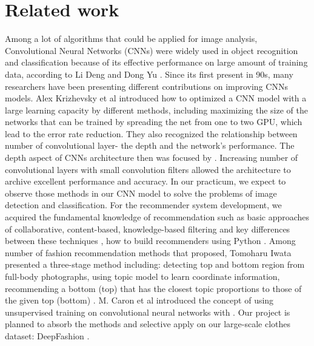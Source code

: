 \section{Related work}
Among a lot of algorithms that could be applied for image analysis, Convolutional Neural Networks (CNNs) were widely used in object recognition and classification because of its effective performance on large amount of training data, according to Li Deng and Dong Yu \cite{deng2014deep}. Since its first present in 90s, many researchers have been presenting different contributions on improving CNNs models. Alex Krizhevsky et al \cite{krizhevsky2017imagenet} introduced how to optimized a CNN model with a large learning capacity by different methods, including maximizing the size of the networks that can be trained by spreading the net from one to two GPU, which lead to the error rate reduction. They also recognized the relationship between number of convolutional layer- the depth and the network’s performance. The depth aspect of CNNs architecture then was focused by \cite{simonyan2014very}. Increasing number of convolutional layers with small convolution filters allowed the architecture to archive excellent performance and accuracy. In our practicum, we expect to observe those methods in our CNN model to solve the problems of image detection and classification.
For the recommender system development, we acquired the fundamental knowledge of recommendation such as basic approaches of collaborative, content-based, knowledge-based filtering and key differences between these techniques \cite{felfernig2014basic}, how to build recommenders using Python \cite{caron2018deep}.  Among number of fashion recommendation methods that proposed, Tomoharu Iwata presented a three-stage method including: detecting top and bottom region from full-body photographs, using topic model to learn coordinate information, recommending a bottom (top) that has the closest topic proportions to those of the given top (bottom) \cite{liu2016deepfashion}. M. Caron et al introduced the concept of using unsupervised training on convolutional neural networks with \cite{felfernig2014basic}. Our project is planned to absorb the methods and selective apply on our large-scale clothes dataset: DeepFashion \cite{rashid2002getting}.